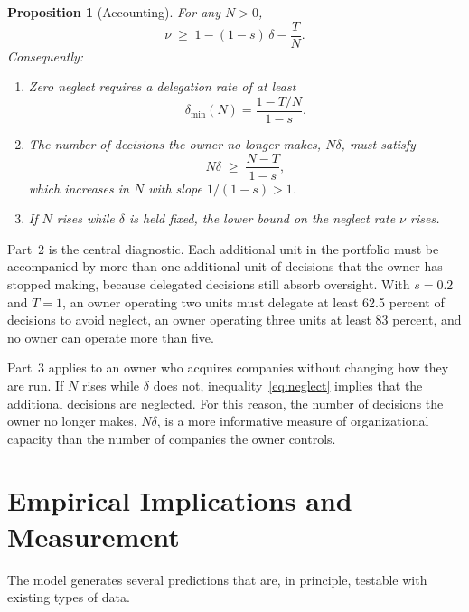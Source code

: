 \documentclass[11pt,a4paper]{article}
\theoremstyle{plain}
\newtheorem{proposition}{Proposition}
\begin{document}
\begin{proposition}[Accounting]\label{prop:accounting}
For any $N > 0$,
\begin{equation}\label{eq:neglect}
  \nu \;\ge\; 1 - (1 - s)\,\delta - \frac{T}{N}.
\end{equation}
Consequently:
\begin{enumerate}
  \item Zero neglect requires a delegation rate of at least
  \begin{equation}\label{eq:deltamin}
    \delta_{\min}(N) = \frac{1 - T/N}{1 - s}.
  \end{equation}
  \item The number of decisions the owner no longer makes, $N\delta$, must satisfy
  \begin{equation}\label{eq:Ndelta}
    N \delta \;\ge\; \frac{N - T}{1 - s},
  \end{equation}
  which increases in $N$ with slope $1/(1-s) > 1$.
  \item If $N$ rises while $\delta$ is held fixed, the lower bound on the neglect rate $\nu$ rises.
\end{enumerate}
\end{proposition}

Part~2 is the central diagnostic. Each additional unit in the portfolio must be accompanied by more than one additional unit of decisions that the owner has stopped making, because delegated decisions still absorb oversight. With $s = 0.2$ and $T = 1$, an owner operating two units must delegate at least 62.5 percent of decisions to avoid neglect, an owner operating three units at least 83 percent, and no owner can operate more than five.

Part~3 applies to an owner who acquires companies without changing how they are run. If $N$ rises while $\delta$ does not, inequality~\eqref{eq:neglect} implies that the additional decisions are neglected. For this reason, the number of decisions the owner no longer makes, $N\delta$, is a more informative measure of organizational capacity than the number of companies the owner controls.

\section{Empirical Implications and Measurement}\label{sec:empirics}

The model generates several predictions that are, in principle, testable with existing types of data.
\end{document}
